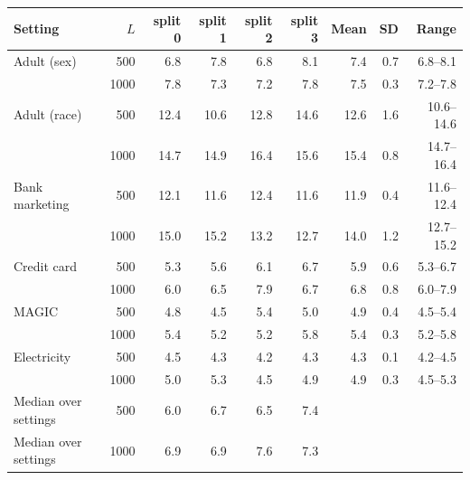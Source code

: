 \begin{tabular}{lrrrrrrrr}\toprule
Setting & $L$ & split 0 & split 1 & split 2 & split 3 & Mean & SD & Range \\\midrule
Adult (sex) & 500 & 6.8 & 7.8 & 6.8 & 8.1 & 7.4 & 0.7 & 6.8--8.1 \\
 & 1000 & 7.8 & 7.3 & 7.2 & 7.8 & 7.5 & 0.3 & 7.2--7.8 \\
\addlinespace
Adult (race) & 500 & 12.4 & 10.6 & 12.8 & 14.6 & 12.6 & 1.6 & 10.6--14.6 \\
 & 1000 & 14.7 & 14.9 & 16.4 & 15.6 & 15.4 & 0.8 & 14.7--16.4 \\
\addlinespace
Bank marketing & 500 & 12.1 & 11.6 & 12.4 & 11.6 & 11.9 & 0.4 & 11.6--12.4 \\
 & 1000 & 15.0 & 15.2 & 13.2 & 12.7 & 14.0 & 1.2 & 12.7--15.2 \\
\addlinespace
Credit card & 500 & 5.3 & 5.6 & 6.1 & 6.7 & 5.9 & 0.6 & 5.3--6.7 \\
 & 1000 & 6.0 & 6.5 & 7.9 & 6.7 & 6.8 & 0.8 & 6.0--7.9 \\
\addlinespace
MAGIC & 500 & 4.8 & 4.5 & 5.4 & 5.0 & 4.9 & 0.4 & 4.5--5.4 \\
 & 1000 & 5.4 & 5.2 & 5.2 & 5.8 & 5.4 & 0.3 & 5.2--5.8 \\
\addlinespace
Electricity & 500 & 4.5 & 4.3 & 4.2 & 4.3 & 4.3 & 0.1 & 4.2--4.5 \\
 & 1000 & 5.0 & 5.3 & 4.5 & 4.9 & 4.9 & 0.3 & 4.5--5.3 \\
\addlinespace
Median over settings & 500 & 6.0 & 6.7 & 6.5 & 7.4 & \multicolumn{3}{c}{} \\
Median over settings & 1000 & 6.9 & 6.9 & 7.6 & 7.3 & \multicolumn{3}{c}{} \\
\bottomrule\end{tabular}
